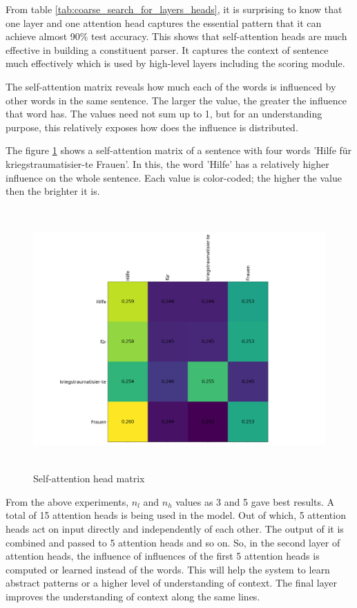 \documentclass[a4paper, 11pt]{article}
\begin{document}
From table \ref{tab:coarse_search_for_layers_heads}, it is surprising to know that one layer and one attention head captures the essential pattern that it can achieve almost 90\% test accuracy. This shows that self-attention heads are much effective in building a constituent parser. It captures the context of sentence much effectively which is used by high-level layers including the scoring module.

The self-attention matrix reveals how much each of the words is influenced by other words in the same sentence. The larger the value, the greater the influence that word has. The values need not sum up to 1, but for an understanding purpose, this relatively exposes how does the influence is distributed. 

The figure \ref{fig:self-attention-head-matrix} shows a self-attention matrix of a sentence with four words 'Hilfe für kriegstraumatisier-te Frauen'. In this, the word 'Hilfe' has a relatively higher influence on the whole sentence. Each value is color-coded; the higher the value then the brighter it is.

\begin{figure}[H]
    \centering
    \includegraphics[width=\textwidth,height=10cm,keepaspectratio=true]
    {attention-head-matrix.png}
    \caption{
        Self-attention head matrix
    }
    \label{fig:self-attention-head-matrix}
\end{figure}

From the above experiments, $n_l$ and $n_h$ values as 3 and 5 gave best results. A total of 15 attention heads is being used in the model. Out of which, 5 attention heads act on input directly and independently of each other. The output of it is combined and passed to 5 attention heads and so on.  So, in the second layer of attention heads, the influence of influences of the first 5 attention heads is computed or learned instead of the words. This will help the system to learn abstract patterns or a higher level of understanding of context. The final layer improves the understanding of context along the same lines.
\end{document}
